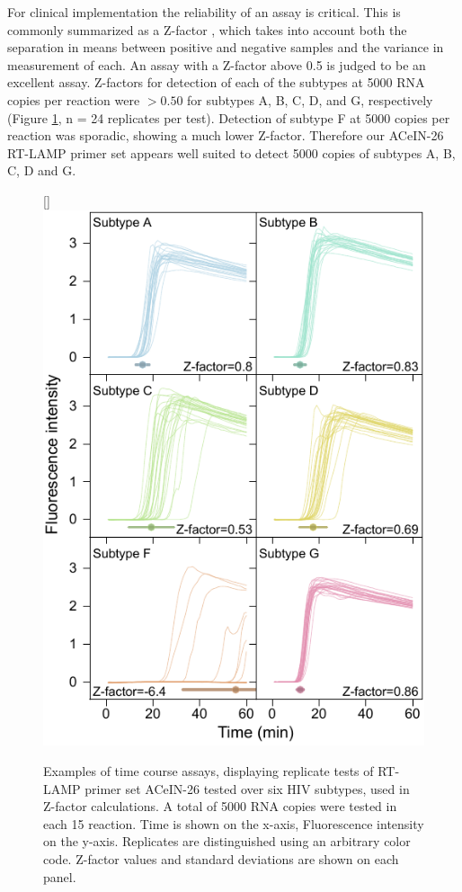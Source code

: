 \documentclass[../sherrill-Mix_thesis.tex]{subfiles}
\begin{document}
			For clinical implementation the reliability of an assay is critical. This is commonly summarized as a Z-factor \citep{Zhang1999}, which takes into account both the separation in means between positive and negative samples and the variance in measurement of each. An assay with a Z-factor above 0.5 is judged to be an excellent assay. Z-factors for detection of each of the subtypes at 5000 RNA copies per reaction were $>0.50$ for subtypes A, B, C, D, and G, respectively (Figure \ref{figZFactor}, n = 24 replicates per test). Detection of subtype F at 5000 copies per reaction was sporadic, showing a much lower Z-factor. Therefore our ACeIN-26 RT-LAMP primer set appears well suited to detect 5000 copies of subtypes A, B, C, D and G.

			\begin{figure}
			[\FBwidth]{
				\includegraphics[width=.6\textwidth]{4.pdf} %
				}{
					\caption[Examples of time course assays, displaying replicate tests of RT-LAMP primer set ACeIN-26 tested over six HIV subtypes, used in Z-factor calculations]{Examples of time course assays, displaying replicate tests of RT-LAMP primer set ACeIN-26 tested over six HIV subtypes, used in Z-factor calculations. A total of 5000 RNA copies were tested in each 15 \uL{} reaction. Time is shown on the x-axis, Fluorescence intensity on the y-axis. Replicates are distinguished using an arbitrary color code. Z-factor values and standard deviations are shown on each panel.}
					\label{figZFactor}
				}
			\end{figure}
\end{document}
